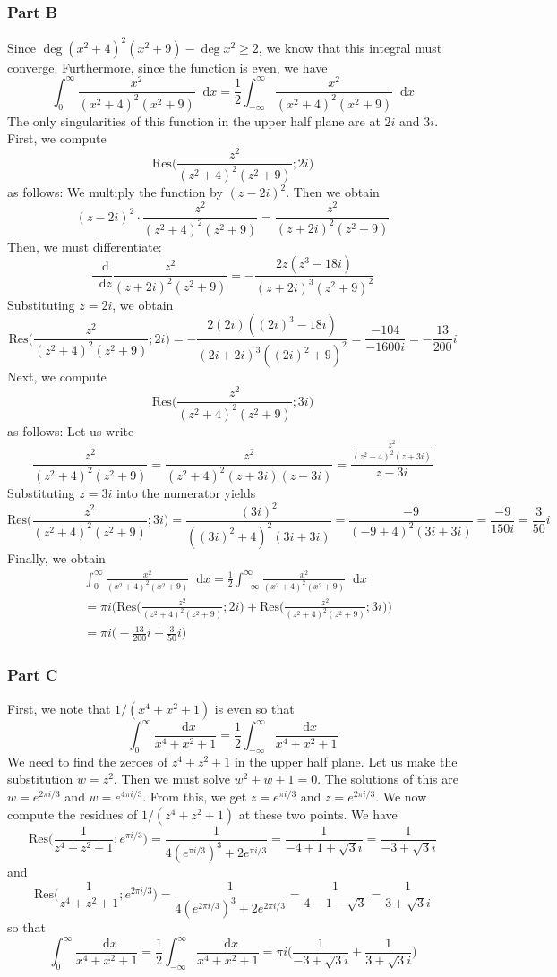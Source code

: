 \documentclass[12pt]{article}
\newcommand*\diff{\mathop{}\!\mathrm{d}}
\begin{document}
\subsubsection*{Part B}
Since $\deg (x^2+4)^2 (x^2 + 9) - \deg x^2  \geq 2$, we know that this integral must converge. Furthermore, since the function is even, we have
\[
\int_0^\infty \frac{x^2}{(x^2+4)^2 (x^2 + 9)} \diff x = \frac{1}{2} \int_{-\infty}^\infty \frac{x^2}{(x^2+4)^2 (x^2 + 9)} \diff x
\] The only singularities of this function in the upper half plane are at $2i$ and $3i$. First, we compute
\[
\text{Res}\bigg(\frac{z^2}{(z^2+4)^2(z^2+9)}; 2i\bigg)
\] as follows: We multiply the function by $(z-2i)^2$. Then we obtain
\[
(z-2i)^2\cdot \frac{z^2}{(z^2+4)^2(z^2+9)} = \frac{z^2}{(z+2i)^2(z^2+9)}
\] Then, we must differentiate:
\[
\frac{\diff}{\diff z} \frac{z^2}{(z+2i)^2(z^2+9)} = -\frac{2z(z^3 - 18i)}{(z+2i)^3(z^2+9)^2}
\] Substituting $z = 2i$, we obtain
\[
\text{Res}\bigg(\frac{z^2}{(z^2+4)^2(z^2+9)}; 2i\bigg) = -\frac{2(2i)((2i)^3 - 18i)}{(2i+2i)^3((2i)^2+9)^2} = \frac{-104}{-1600i} = -\frac{13}{200}i
\] Next, we compute
\[
\text{Res}\bigg(\frac{z^2}{(z^2+4)^2(z^2+9)}; 3i\bigg)
\] as follows: Let us write 
\[
\frac{z^2}{(z^2+4)^2(z^2+9)} = \frac{z^2}{(z^2+4)^2(z+3i)(z-3i)} = \frac{\frac{z^2}{(z^2+4)^2(z+3i)}}{z-3i}
\] Substituting $z = 3i$ into the numerator yields 
\[
 \text{Res}\bigg(\frac{z^2}{(z^2+4)^2(z^2+9)}; 3i\bigg) = \frac{(3i)^2}{((3i)^2+4)^2(3i+3i)} = \frac{-9}{(-9+4)^2(3i+3i)} = \frac{-9}{150i} = \frac{3}{50}i
\] Finally, we obtain
\begin{align*}
&\int_0^\infty \frac{x^2}{(x^2+4)^2 (x^2 + 9)} \diff x = \frac{1}{2} \int_{-\infty}^\infty \frac{x^2}{(x^2+4)^2 (x^2 + 9)} \diff x \\
& = \pi i \Bigg( \text{Res}\bigg(\frac{z^2}{(z^2+4)^2(z^2+9)}; 2i\bigg) + \text{Res}\bigg(\frac{z^2}{(z^2+4)^2(z^2+9)}; 3i\bigg)\Bigg) \\
&= \pi i\bigg(-\frac{13}{200}i + \frac{3}{50}i\bigg)
\end{align*}
\subsubsection*{Part C}
First, we note that $1/(x^4+x^2+1)$ is even so that
\[
\int_0^\infty \frac{\diff x}{x^4 + x^2 + 1} = \frac{1}{2} \int_{-\infty}^\infty \frac{\diff x}{x^4 + x^2 + 1}
\] We need to find the zeroes of $z^4 + z^2 + 1$ in the upper half plane. Let us make the substitution $w = z^2$. Then we must solve $w^2 + w + 1 = 0$. The solutions of this are $w = e^{2\pi i/3}$ and $w = e^{4 \pi i / 3}$. From this, we get $z = e^{\pi i/3}$ and $z = e^{2\pi i / 3}$. We now compute the residues of $1/(z^4+z^2+1)$ at these two points. We have
\[
\text{Res}\bigg(\frac{1}{z^4+z^2+1}; e^{\pi i /3}\bigg) = \frac{1}{4(e^{\pi i /3})^3 + 2e^{\pi i / 3}} = \frac{1}{-4 + 1 + \sqrt{3}i} = \frac{1}{-3+\sqrt{3}i}
\] and
\[
\text{Res}\bigg(\frac{1}{z^4+z^2+1}; e^{ 2 \pi i /3}\bigg) = \frac{1}{4(e^{2\pi i /3})^3 + 2e^{2\pi i / 3}} = \frac{1}{4 - 1 -\sqrt{3}} = \frac{1}{3+\sqrt{3}i}
\] so that
\[
\int_0^\infty \frac{\diff x}{x^4 + x^2 + 1} = \frac{1}{2} \int_{-\infty}^\infty \frac{\diff x}{x^4 + x^2 + 1} = \pi i \bigg(\frac{1}{-3+\sqrt{3}i} + \frac{1}{3+\sqrt{3}i} \bigg)
\]
\end{document}
